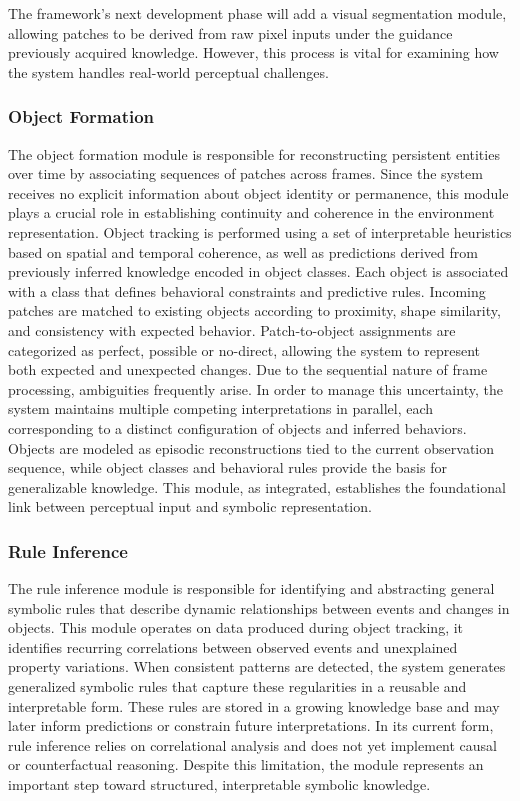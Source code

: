 \documentclass[12pt,a4paper]{report}
\begin{document}
The framework's next development phase will add a visual segmentation module, allowing patches to be derived from raw pixel inputs under the guidance previously acquired knowledge. However, this process is vital for examining how the system handles real-world perceptual challenges.

\subsubsection{Object Formation}
The object formation module is responsible for reconstructing persistent entities over time by associating sequences of patches across frames. Since the system receives no explicit information about object identity or permanence, this module plays a crucial role in establishing continuity and coherence in the environment representation.
Object tracking is performed using a set of interpretable heuristics based on spatial and temporal coherence, as well as predictions derived from previously inferred knowledge encoded in object classes. Each object is associated with a class that defines behavioral constraints and predictive rules. Incoming patches are matched to existing objects according to proximity, shape similarity, and consistency with expected behavior.
Patch-to-object assignments are categorized as perfect, possible or no-direct, allowing the system to represent both expected and unexpected changes. Due to the sequential nature of frame processing, ambiguities frequently arise. In order to manage this uncertainty, the system maintains multiple competing interpretations in parallel, each corresponding to a distinct configuration of objects and inferred behaviors.
Objects are modeled as episodic reconstructions tied to the current observation sequence, while object classes and behavioral rules provide the basis for generalizable knowledge. This module, as integrated, establishes the foundational link between perceptual input and symbolic representation.

\subsubsection{Rule Inference}
The rule inference module is responsible for identifying and abstracting general symbolic rules that describe dynamic relationships between events and changes in objects. This module operates on data produced during object tracking, it identifies recurring correlations between observed events and unexplained property variations.
When consistent patterns are detected, the system generates generalized symbolic rules that capture these regularities in a reusable and interpretable form. These rules are stored in a growing knowledge base and may later inform predictions or constrain future interpretations.
In its current form, rule inference relies on correlational analysis and does not yet implement causal or counterfactual reasoning. Despite this limitation, the module represents an important step toward structured, interpretable symbolic knowledge.
\end{document}
